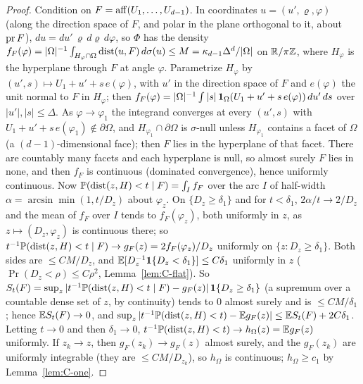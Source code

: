 \begin{proof}
Condition on $F = \operatorname{aff}(U_1, \dots, U_{d-1})$. In coordinates $u = (u', \varrho, \varphi)$ (along the direction space of $F$,
and polar in the plane orthogonal to it, about $\operatorname{pr} F$), $du = du'\,\varrho\,d\varrho\,d\varphi$, so $\Phi$ has the density
$f_F(\varphi) = |\Omega|^{-1}\int_{H_\varphi \cap \Omega}\operatorname{dist}(u, F)\,d\sigma(u) \le M = \kappa_{d-1}\Delta^d/|\Omega|$ on $\mathbb{R}/\pi\mathbb{Z}$, where $H_\varphi$
is the hyperplane through $F$ at angle $\varphi$. Parametrize $H_\varphi$ by $(u', s) \mapsto U_1 + u' + s\,e(\varphi)$, with $u'$ in the
direction space of $F$ and $e(\varphi)$ the unit normal to $F$ in $H_\varphi$; then $f_F(\varphi) = |\Omega|^{-1}\int|s|\,\mathbf{1}_\Omega(U_1 + u' + s\,e(\varphi))\,du'\,ds$
over $|u'|, |s| \le \Delta$. As $\varphi \to \varphi_1$ the integrand converges at every $(u', s)$ with $U_1 + u' + s\,e(\varphi_1) \notin \partial\Omega$, and
$H_{\varphi_1} \cap \partial\Omega$ is $\sigma$-null unless $H_{\varphi_1}$ contains a facet of $\Omega$ (a $(d-1)$-dimensional face);
then $F$ lies in the hyperplane of that facet. There are countably many facets and each hyperplane is
null, so almost surely $F$ lies in none, and then $f_F$ is continuous (dominated convergence), hence uniformly
continuous. Now $\mathbb{P}(\operatorname{dist}(z, H) < t \mid F) = \int_{I}f_F$ over the arc $I$ of half-width $\alpha = \arcsin\min(1, t/D_z)$
about $\varphi_z$. On $\{D_z \ge \delta_1\}$ and for $t < \delta_1$, $2\alpha/t \to 2/D_z$ and the mean of $f_F$ over $I$ tends to
$f_F(\varphi_z)$, both uniformly in $z$, as $z \mapsto (D_z, \varphi_z)$ is continuous there; so
$t^{-1}\mathbb{P}(\operatorname{dist}(z, H) < t \mid F) \to g_F(z) = 2f_F(\varphi_z)/D_z$ uniformly on $\{z : D_z \ge \delta_1\}$. Both sides are
$\le CM/D_z$, and $\mathbb{E}[D_z^{-1}\mathbf{1}\{D_z < \delta_1\}] \le C\delta_1$ uniformly in $z$ ($\Pr(D_z < \rho) \le C\rho^2$, Lemma~\ref{lem:C-flat}).
So $S_t(F) = \sup_z|t^{-1}\mathbb{P}(\operatorname{dist}(z, H) < t \mid F) - g_F(z)|\,\mathbf{1}\{D_z \ge \delta_1\}$ (a supremum over a countable dense set
of $z$, by continuity) tends to $0$ almost surely and is $\le CM/\delta_1$; hence $\mathbb{E} S_t(F) \to 0$, and
$\sup_z|t^{-1}\mathbb{P}(\operatorname{dist}(z, H) < t) - \mathbb{E} g_F(z)| \le \mathbb{E} S_t(F) + 2C\delta_1$. Letting $t \to 0$ and then $\delta_1 \to 0$,
$t^{-1}\mathbb{P}(\operatorname{dist}(z, H) < t) \to h_\Omega(z) = \mathbb{E} g_F(z)$ uniformly. If $z_k \to z$, then $g_F(z_k) \to g_F(z)$ almost surely,
and the $g_F(z_k)$ are uniformly integrable (they are $\le CM/D_{z_k}$), so $h_\Omega$ is continuous; $h_\Omega \ge c_1$ by
Lemma~\ref{lem:C-one}.
\end{proof}

